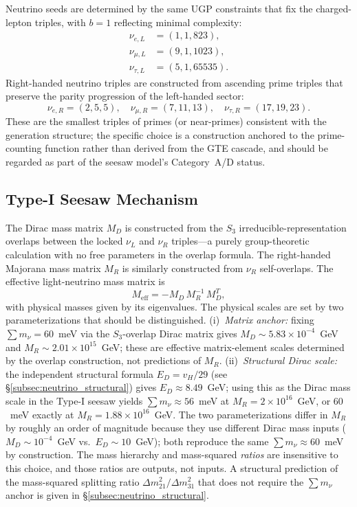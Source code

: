 \documentclass[11pt]{article}
\theoremstyle{remark}
\begin{document}
Neutrino seeds are determined by the same UGP constraints that fix the charged-lepton triples, with $b = 1$ reflecting minimal complexity:
\begin{align*}
\nu_{e,L} &= (1, 1, 823), \\ \nu_{\mu,L} &= (9, 1, 1023), \\ \nu_{\tau,L} &= (5, 1, 65535).
\end{align*}
Right-handed neutrino triples are constructed from ascending prime triples that preserve the parity progression of the left-handed sector:
\[
\nu_{e,R} = (2, 5, 5), \quad \nu_{\mu,R} = (7, 11, 13), \quad \nu_{\tau,R} = (17, 19, 23).
\]
These are the smallest triples of primes (or near-primes) consistent with the generation structure; the specific choice is a construction anchored to the prime-counting function rather than derived from the GTE cascade, and should be regarded as part of the seesaw model's Category~A/D status.

\subsection{Type-I Seesaw Mechanism}

The Dirac mass matrix $M_D$ is constructed from the $S_3$ irreducible-representation overlaps between the locked $\nu_L$ and $\nu_R$ triples---a purely group-theoretic calculation with no free parameters in the overlap formula.
The right-handed Majorana mass matrix $M_R$ is similarly constructed from $\nu_R$ self-overlaps.
The effective light-neutrino mass matrix is
\begin{equation}
M_{\mathrm{eff}} = -M_D \, M_R^{-1} \, M_D^T,
\end{equation}
with physical masses given by its eigenvalues.
The physical scales are set by two parameterizations that should be distinguished.  (i)~\emph{Matrix anchor:} fixing $\sum m_\nu = 60$~meV via the $S_3$-overlap Dirac matrix gives $M_D \sim 5.83 \times 10^{-4}$~GeV and $M_R \sim 2.01 \times 10^{15}$~GeV; these are effective matrix-element scales determined by the overlap construction, not predictions of $M_R$.  (ii)~\emph{Structural Dirac scale:} the independent structural formula $E_D = v_H/29$ (see \S\ref{subsec:neutrino_structural}) gives $E_D \approx 8.49$~GeV; using this as the Dirac mass scale in the Type-I seesaw yields $\sum m_\nu \approx 56$~meV at $M_R = 2 \times 10^{16}$~GeV, or $60$~meV exactly at $M_R = 1.88 \times 10^{16}$~GeV.  The two parameterizations differ in $M_R$ by roughly an order of magnitude because they use different Dirac mass inputs ($M_D \sim 10^{-4}$~GeV vs.\ $E_D \sim 10$~GeV); both reproduce the same $\sum m_\nu \approx 60$~meV by construction.  The mass hierarchy and mass-squared \emph{ratios} are insensitive to this choice, and those ratios are outputs, not inputs.
A structural prediction of the mass-squared splitting ratio $\Delta m^2_{21}/\Delta m^2_{31}$ that does not require the $\sum m_\nu$ anchor is given in \S\ref{subsec:neutrino_structural}.
\end{document}
